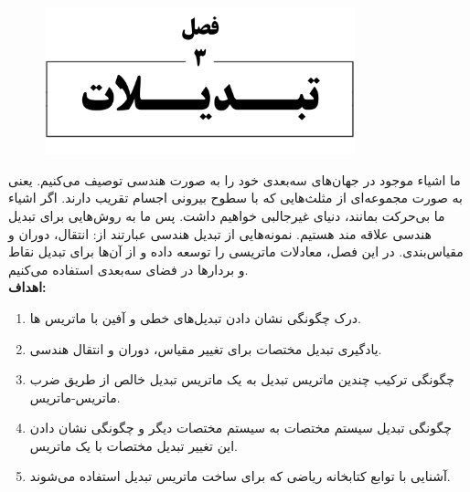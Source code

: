 \newpage

\setcounter{chapter}{3}
\setcounter{section}{0}
\setcounter{point}{0}
\setcounter{eqtn}{0}
\setcounter{exmp}{0}
\setcounter{hint}{0}


\chapter{}
\textbf{\vspace{-150pt}}
\begin{figure}[H]
    \centering
    \setlength{\belowcaptionskip}{-10pt}
    \includegraphics[width=0.8\textwidth]{Images/4/3/4.Session.1.3.0}
    \label{fig:4.Session.1.3.0}
\end{figure}
\textbf{\vspace{10pt}}
{
    \Large
    \begin{spacing}{1.5}
        ما اشیاء موجود در جهان‌های سه‌بعدی خود را به صورت هندسی توصیف می‌کنیم.
        یعنی به صورت مجموعه‌ای از مثلث‌هایی که با سطوح بیرونی اجسام تقریب دارند.
        اگر اشیاء ما بی‌حرکت بمانند، دنیای غیر‌جالبی خواهیم داشت.
        پس ما به روش‌هایی برای تبدیل هندسی علاقه مند هستیم.
        نمونه‌هایی از تبدیل هندسی عبارتند از: انتقال، دوران و مقیاس‌بندی.
        در این فصل، معادلات ماتریسی را توسعه داده و از آن‌ها برای تبدیل نقاط و بردارها در فضای سه‌بعدی استفاده می‌کنیم.
        \\

        \textbf{\LARGE \hspace{-40pt}اهداف:}
        \begin{enumerate}[label=\textbf{\arabic*}.]
            \item {درک چگونگی نشان دادن تبدیل‌های خطی و آفین با ماتریس ها.}
            \item {یادگیری تبدیل مختصات برای تغییر مقیاس، دوران و انتقال هندسی.}
            \item {چگونگی ترکیب چندین ماتریس تبدیل به یک ماتریس تبدیل خالص از طریق ضرب ماتریس-ماتریس.}
            \item {چگونگی تبدیل سیستم مختصات به سیستم مختصات دیگر و چگونگی نشان دادن این تغییر تبدیل مختصات با یک ماتریس.}
            \item {آشنایی با توابع کتابخانه ریاضی  که برای ساخت ماتریس تبدیل استفاده می‌شوند.}
        \end{enumerate}
    \end{spacing}
}
\newpage


